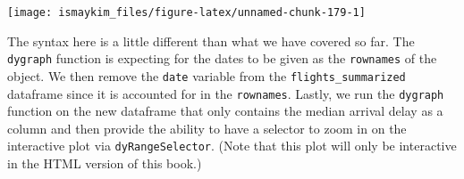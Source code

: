 \documentclass[]{tufte-book}
\theoremstyle{definition}
\theoremstyle{definition}
\theoremstyle{remark}
\begin{document}
\begin{center}\texttt{[image: ismaykim\_files/figure-latex/unnamed-chunk-179-1]} \end{center}

The syntax here is a little different than what we have covered so far.
The \texttt{dygraph} function is expecting for the dates to be given as
the \texttt{rownames} of the object. We then remove the \texttt{date}
variable from the \texttt{flights\_summarized} dataframe since it is
accounted for in the \texttt{rownames}. Lastly, we run the
\texttt{dygraph} function on the new dataframe that only contains the
median arrival delay as a column and then provide the ability to have a
selector to zoom in on the interactive plot via
\texttt{dyRangeSelector}. (Note that this plot will only be interactive
in the HTML version of this book.)

\renewcommand{\bibname}{References}

% 
% 
\end{document}

